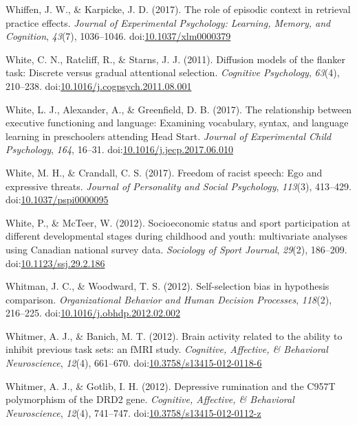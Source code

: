\documentclass[english,man]{apa6}
\begin{document}
\hypertarget{ref-Whiffen2017}{}
Whiffen, J. W., \& Karpicke, J. D. (2017). The role of episodic context
in retrieval practice effects. \emph{Journal of Experimental Psychology:
Learning, Memory, and Cognition}, \emph{43}(7), 1036--1046.
doi:\href{https://doi.org/10.1037/xlm0000379}{10.1037/xlm0000379}

\hypertarget{ref-White2011}{}
White, C. N., Ratcliff, R., \& Starns, J. J. (2011). Diffusion models of
the flanker task: Discrete versus gradual attentional selection.
\emph{Cognitive Psychology}, \emph{63}(4), 210--238.
doi:\href{https://doi.org/10.1016/j.cogpsych.2011.08.001}{10.1016/j.cogpsych.2011.08.001}

\hypertarget{ref-White2017}{}
White, L. J., Alexander, A., \& Greenfield, D. B. (2017). The
relationship between executive functioning and language: Examining
vocabulary, syntax, and language learning in preschoolers attending Head
Start. \emph{Journal of Experimental Child Psychology}, \emph{164},
16--31.
doi:\href{https://doi.org/10.1016/j.jecp.2017.06.010}{10.1016/j.jecp.2017.06.010}

\hypertarget{ref-White2017a}{}
White, M. H., \& Crandall, C. S. (2017). Freedom of racist speech: Ego
and expressive threats. \emph{Journal of Personality and Social
Psychology}, \emph{113}(3), 413--429.
doi:\href{https://doi.org/10.1037/pspi0000095}{10.1037/pspi0000095}

\hypertarget{ref-White2012}{}
White, P., \& McTeer, W. (2012). Socioeconomic status and sport
participation at different developmental stages during childhood and
youth: multivariate analyses using Canadian national survey data.
\emph{Sociology of Sport Journal}, \emph{29}(2), 186--209.
doi:\href{https://doi.org/10.1123/ssj.29.2.186}{10.1123/ssj.29.2.186}

\hypertarget{ref-Whitman2012}{}
Whitman, J. C., \& Woodward, T. S. (2012). Self-selection bias in
hypothesis comparison. \emph{Organizational Behavior and Human Decision
Processes}, \emph{118}(2), 216--225.
doi:\href{https://doi.org/10.1016/j.obhdp.2012.02.002}{10.1016/j.obhdp.2012.02.002}

\hypertarget{ref-Whitmer2012a}{}
Whitmer, A. J., \& Banich, M. T. (2012). Brain activity related to the
ability to inhibit previous task sets: an fMRI study. \emph{Cognitive,
Affective, \& Behavioral Neuroscience}, \emph{12}(4), 661--670.
doi:\href{https://doi.org/10.3758/s13415-012-0118-6}{10.3758/s13415-012-0118-6}

\hypertarget{ref-Whitmer2012}{}
Whitmer, A. J., \& Gotlib, I. H. (2012). Depressive rumination and the
C957T polymorphism of the DRD2 gene. \emph{Cognitive, Affective, \&
Behavioral Neuroscience}, \emph{12}(4), 741--747.
doi:\href{https://doi.org/10.3758/s13415-012-0112-z}{10.3758/s13415-012-0112-z}
\end{document}
